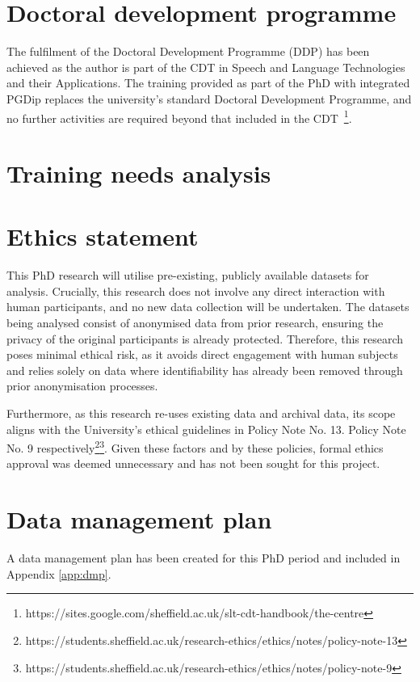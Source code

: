 \documentclass[10pt,oneside]{book}
\begin{document}
\section{Doctoral development programme}

The fulfilment of the Doctoral Development Programme (DDP) has been achieved as the author is part of the CDT in Speech and Language Technologies and their Applications. The training provided as part of the PhD with integrated PGDip replaces the university's standard Doctoral Development Programme, and no further activities are required beyond that included in the CDT~\footnote{https://sites.google.com/sheffield.ac.uk/slt-cdt-handbook/the-centre}.

\section{Training needs analysis}


\section{Ethics statement}

This PhD research will utilise pre-existing, publicly available datasets for analysis. Crucially, this research does not involve any direct interaction with human participants, and no new data collection will be undertaken. The datasets being analysed consist of anonymised data from prior research, ensuring the privacy of the original participants is already protected. Therefore, this research poses minimal ethical risk, as it avoids direct engagement with human subjects and relies solely on data where identifiability has already been removed through prior anonymisation processes.

Furthermore, as this research re-uses existing data and archival data, its scope aligns with the University's ethical guidelines in Policy Note No. 13. Policy Note No. 9 respectively\footnote{https://students.sheffield.ac.uk/research-ethics/ethics/notes/policy-note-13}\footnote{https://students.sheffield.ac.uk/research-ethics/ethics/notes/policy-note-9}. Given these factors and by these policies, formal ethics approval was deemed unnecessary and has not been sought for this project.
\section{Data management plan}

A data management plan has been created for this PhD period and included in Appendix \ref{app:dmp}.
\end{document}
